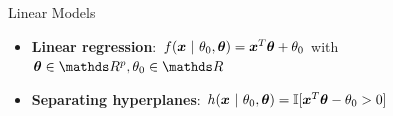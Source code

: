 \begin{vbframe}{Linear Models}

\begin{itemize}

  \item \textbf{Linear regression}: $f(\bm{x} ~|~ \theta_0, \bm{\theta}) = \bm{x}^T\bm{\theta} + \theta_0$ with $\bm{\theta} \in \R^p, \theta_0 \in \R$
  \begin{figure}
    \centering
  \end{figure}

  \item \textbf{Separating hyperplanes}: $h(\bm{x} ~|~ \theta_0, \bm{\theta}) = \mathbb{I}[\bm{x}^T\bm{\theta} - \theta_0 > 0]$%
  \begin{figure}
    \centering
  \end{figure}
  \end{itemize}
\end{vbframe}


